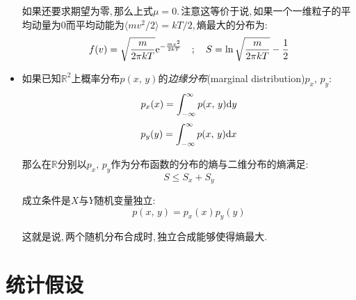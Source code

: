\begin{itemize}
	如果还要求期望为零,\,那么上式$\mu=0$.\,注意这等价于说,\,如果一个一维粒子的平均动量为$0$而平均动能为$\langle mv^2/2\rangle=kT/2$,\,熵最大的分布为:
	\[f(v)=\sqrt{\frac{m}{2\pi kT}}{\rm e}^{-\frac{mv^2}{2kT}}\quad ;\quad S=\ln\sqrt{\frac{m}{2\pi kT}}-\frac{1}{2}\]

	\item 如果已知$\mathbb{R}^2$上概率分布$p(x,\,y)$的\emph{边缘分布}(marginal distribution)$p_x,\,p_y$:
	\[p_x(x)=\int_{-\infty}^\infty p(x,\,y)\textrm{d} y\]
	\[p_y(y)=\int_{-\infty}^\infty p(x,\,y)\textrm{d} x\]

	那么在$\mathbb{R}$分别以$p_x,\,p_y$作为分布函数的分布的熵与二维分布的熵满足:
	\[S\leq S_x+S_y\]

	成立条件是$X$与$Y$随机变量独立:
	\[p(x,\,y)=p_x(x)p_y(y)\]

	这就是说,\,两个随机分布合成时,\,独立合成能够使得熵最大.

\end{itemize}

\section{统计假设}
\begin{comment}
原则上来说,\,经典的物理体系应当是\emph{确定性}(certainty)的,\,用经典力学语言可以描述(质点系的位置与动量)的,\,不包含\emph{随机性}(randomness)的,\,不应引入概率描述的系统.\,然而一方面由于体系在大粒子数大自由度数下所体现出来的统计复杂性,\,即使初态是一个高度特殊的状态:\,比如一个长方体气缸内理想气体初始时刻所有粒子排列为规则的点阵,\,具有完全相同的速度矢量.\,在历经一段时间之后也会体现出完全的随机性:\,体系在很长一段时间内看来各个状态都没有明显的\emph{序}(order),\,显得杂乱无章.\,而稍微有序的状态几乎不可能再次出现.\,这期间的过程与演化,\,原则上说理应是确定性的过程,\,如果我们在某一时刻命所有粒子的速度方向反向,\,这个体系将会重新回到最初的状态.

但是我们将研究\emph{随机过程}(stochastic process),\,在一个随机过程中,\,即使上一刻只有唯一的一种状态,\,下一刻的状态也不是决定性的,\,而是体现出不确定性或是随机性.\,从而对一个时刻系统完整的描述就要包含在各种可能状态下的概率,\,这实际上是一个\emph{系综}(ensemble).\,用系综而不是单个的系统描述,\,从而引入概率的原因有以下几个:

\begin{itemize}
	\item 外在随机性:\,多自由系统是混沌系统,\,初态微小的改变将会随时间以指数形式迅速放大.\,热力学体系总是处在外界环境中,\,外界总是对体系有各种各样的微小扰动.\,即使在之前的情况下在某个时间让所有粒子速度反向,\,也会因为外界对体系的影响而无法观察到体系回到初始状态.
	\item 内在随机性:\,以衰变为例,\,如果认为衰变发生在一个瞬间,\,粒子只可能处于衰变前或衰变后两个不同状态,\,那么衰变就是一个随机的过程.\,每一小段时间粒子均以均等的概率衰变,\,那么大量全同未衰变的粒子构成的体系的未衰变数期望随时间将指数衰减,\,但是每一个时刻未衰变粒子数仍然具有某种概率分布,\,粒子数对于其期望仍具有某种方差.\,事实上原子与原子的碰撞涉及到量子力学行为,\,同样的初始条件是会导致不同的结果的.
\end{itemize}
\end{comment}

